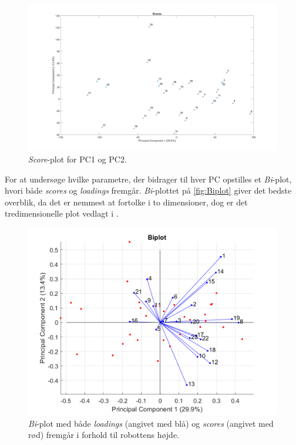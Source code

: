 %
\begin{figure}[H]
\centering
\includegraphics[width=\textwidth]{Figure/DatabehandlingSkalaer/PCAfigures/Scores}
\caption{\textit{Score}-plot for PC1 og PC2.}
\label{fig:Score}
\end{figure}
\noindent
%
For at undersøge hvilke parametre, der bidrager til hver PC opstilles et \textit{Bi}-plot, hvori både \textit{scores} og \textit{loadings} fremgår. \textit{Bi}-plottet på \autoref{fig:Biplot} giver det bedste overblik, da det er nemmest at fortolke i to dimensioner, dog er det tredimensionelle plot vedlagt i . 
%
\begin{figure}[H]
\centering
\includegraphics[width=\textwidth]{Figure/DatabehandlingSkalaer/PCAfigures/Biplot}
\caption{\textit{Bi}-plot med både \textit{loadings} (angivet med blå) og \textit{scores} (angivet med rød) fremgår i forhold til robottens højde.}
\label{fig:Biplot}
\end{figure}
